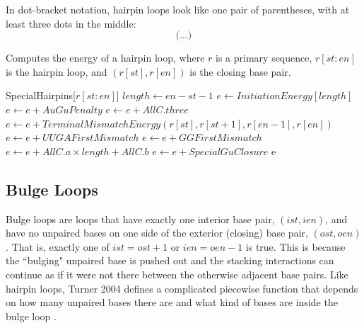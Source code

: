 \documentclass{cshonours}
\newcommand{\pushcode}[1]{\multido{\i=0+1}{#1}{\hskip\algorithmicindent}}
\begin{document}
In dot-bracket notation, hairpin loops look like one pair of parentheses, with at least three dots in the middle:
$$\texttt{(...)}$$

\begin{algorithm}[H]
\caption{Computes the energy of a hairpin loop, where $r$ is a primary sequence, $r[st:en]$ is the hairpin loop, and $(r[st], r[en])$ is the closing base pair.}
\label{alg:hairpin_energy}
\begin{algorithmic}
\State \Return SpecialHairpins[$r[st:en]$]
\EndIf
\State $length \gets en - st - 1$
\State $e \gets InitiationEnergy[length]$ 
\State $e \gets e + AuGuPenalty$
\EndIf
{}
\State $e \gets e + AllC.three$ 
\EndIf
\Else
\State $e \gets e + TerminalMismatchEnergy(r[st], r[st + 1], r[en-1], r[en])$
\State $e \gets e + UUGAFirstMismatch$
\State $e \gets e + GGFirstMismatch$
\EndIf
{}
\State $e \gets e + AllC.a \times length + AllC.b$
\EndIf
\If{$(r[st], r[en])$ is exactly GU \bf{and} \\
\pushcode{3} $st \geq 2$ \bf{and} $r[st - 1] = r[st - 2] = G$}
\State $e \gets e + SpecialGuClosure$
\EndIf
\EndIf
\State \Return e
\EndFunction
\end{algorithmic}
\end{algorithm}

\subsection{Bulge Loops}
Bulge loops are loops that have exactly one interior base pair, $(ist, ien)$, and have no unpaired bases on one side of the exterior (closing) base pair, $(ost, oen)$. That is, exactly one of $ist = ost + 1$ or $ien = oen - 1$ is true. This is because the ``bulging" unpaired base is pushed out and the stacking interactions can continue as if it were not there between the otherwise adjacent base pairs. Like hairpin loops, Turner 2004 defines a complicated piecewise function that depends on how many unpaired bases there are and what kind of bases are inside the bulge loop \cite{tNndb}.
\end{document}
